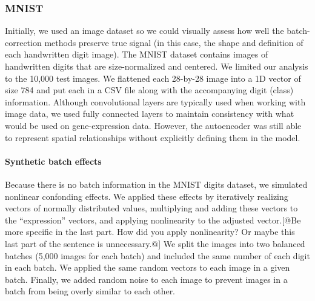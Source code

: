 \documentclass[11pt]{article}
\begin{document}

\subsubsection{MNIST}

Initially, we used an image dataset so we could visually assess how well the batch-correction methods preserve true signal (in this case, the shape and definition of each handwritten digit image).
The MNIST dataset \cite{lecun_mnist_nodate} contains images of handwritten digits that are size-normalized and centered.
We limited our analysis to the 10,000 test images.
We flattened each 28-by-28 image into a 1D vector of size 784 and put each in a CSV file along with the accompanying digit (class) information.
Although convolutional layers are typically used when working with image data, we used fully connected layers to maintain consistency with what would be used on gene-expression data.
However, the autoencoder was still able to represent spatial relationships without explicitly defining them in the model.

\paragraph{Synthetic batch effects}

Because there is no batch information in the MNIST digits dataset, we simulated nonlinear confonding effects.
We applied these effects by iteratively realizing vectors of normally distributed values, multiplying and adding these vectors to the ``expression'' vectors, and applying nonlinearity to the adjusted vector.[@Be more specific in the last part. How did you apply nonlinearity? Or maybe this last part of the sentence is unnecessary.@]
We split the images into two balanced batches (5,000 images for each batch) and included the same number of each digit in each batch.
We applied the same random vectors to each image in a given batch.
Finally, we added random noise to each image to prevent images in a batch from being overly similar to each other.
\end{document}
